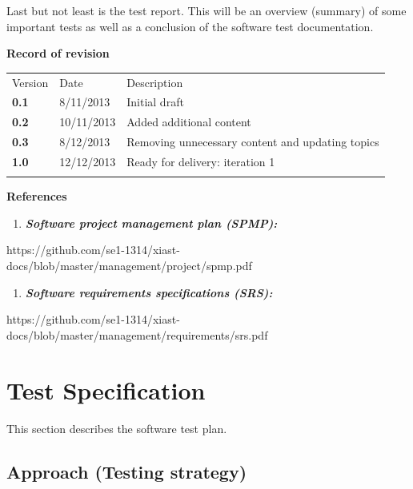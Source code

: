 \documentclass[12pt]{article}
\begin{document}
Last but not least is the test report. This will be an overview
(summary) of some important tests as well as a conclusion of the
software test documentation.

\textbf{Record of revision}

\begin{longtable}[c]{@{}lll@{}}
\hline\noalign{\medskip}
Version & Date & Description
\\\noalign{\medskip}
\hline\noalign{\medskip}
\textbf{0.1} & 8/11/2013 & Initial draft
\\\noalign{\medskip}
\textbf{0.2} & 10/11/2013 & Added additional content
\\\noalign{\medskip}
\textbf{0.3} & 8/12/2013 & Removing unnecessary content and updating topics
\\\noalign{\medskip}
\textbf{1.0} & 12/12/2013 & Ready for delivery: iteration 1
\\\noalign{\medskip}
\hline
\end{longtable}

\textbf{References}

\begin{enumerate}
\def\labelenumi{\arabic{enumi}.}
\itemsep1pt\parskip0pt
\item
  \textbf{\emph{Software project management plan (SPMP):}}
\end{enumerate}

https://github.com/se1-1314/xiast-docs/blob/master/management/project/spmp.pdf

\begin{enumerate}
\def\labelenumi{\arabic{enumi}.}
\setcounter{enumi}{1}
\itemsep1pt\parskip0pt
\item
  \textbf{\emph{Software requirements specifications (SRS):}}
\end{enumerate}

https://github.com/se1-1314/xiast-docs/blob/master/management/requirements/srs.pdf

\section{Test Specification}\label{test-specification}

This section describes the software test plan.

\subsection{Approach (Testing
strategy)}\label{approach-testing-strategy}
\end{document}

